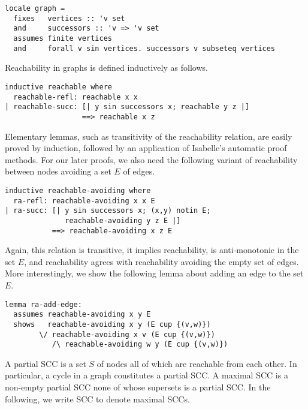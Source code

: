 \documentclass[sigplan,10pt,anonymous,review]{acmart}
\begin{document}
\begin{small}
\begin{lstlisting}[language=isabelle]
locale graph =
  fixes   vertices :: 'v set
  and     successors :: 'v => 'v set
  assumes finite vertices  
  and     forall v sin vertices. successors v subseteq vertices
\end{lstlisting}
\end{small}

Reachability in graphs is defined inductively as follows.

\begin{small}
\begin{lstlisting}[language=isabelle]
inductive reachable where
  reachable-refl: reachable x x
| reachable-succ: [| y sin successors x; reachable y z |]
                  ==> reachable x z
\end{lstlisting}
\end{small}

Elementary lemmas, such as transitivity of the reachability relation, are easily proved by induction, followed by an application of Isabelle's automatic proof methods. For our later proofs, we also need the following variant of reachability between nodes avoiding a set $E$ of edges.

\begin{small}
\begin{lstlisting}[language=isabelle]
inductive reachable-avoiding where
  ra-refl: reachable-avoiding x x E
| ra-succ: [| y sin successors x; (x,y) notin E; 
              reachable-avoiding y z E |] 
           ==> reachable-avoiding x z E
\end{lstlisting}
\end{small}

Again, this relation is transitive, it implies reachability, is anti-monotonic in the set $E$, and reachability agrees with reachability avoiding the empty set of edges. More interestingly, we show the following lemma about adding an edge to the set $E$.

\begin{small}
\begin{lstlisting}[language=isabelle]
lemma ra-add-edge:
  assumes reachable-avoiding x y E
  shows   reachable-avoiding x y (E cup {(v,w)})
        \/ reachable-avoiding x v (E cup {(v,w)})
           /\ reachable-avoiding w y (E cup {(v,w)})
\end{lstlisting}
\end{small}

A partial SCC is a set $S$ of nodes all of which are reachable from each other. In particular, a cycle in a graph constitutes a partial SCC. A maximal SCC is a non-empty partial SCC none of whose supersets is a partial SCC. In the following, we write SCC to denote maximal SCCs.
\end{document}
